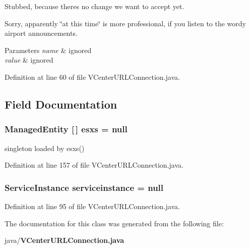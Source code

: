 Stubbed, because there\textquotesingle{}s no change we want to accept yet. 

Sorry, apparently \char`\"{}at this time\char`\"{} is more professional, if you listen to the wordy airport announcements.


\begin{DoxyParams}{Parameters}
{\em name} & ignored \\
\hline
{\em value} & ignored \\
\hline
\end{DoxyParams}


Definition at line 60 of file V\+Center\+U\+R\+L\+Connection.\+java.



\subsection{Field Documentation}
\subsubsection[{esxs}]{\setlength{\rightskip}{0pt plus 5cm}Managed\+Entity [$\,$] esxs = null\hspace{0.3cm}{\ttfamily [protected]}}\label{classorg_1_1smallfoot_1_1parser_1_1vmware_1_1VCenterURLConnection_a33f211087f486d6a140a235e1218c93c}


singleton loaded by esxs() 



Definition at line 157 of file V\+Center\+U\+R\+L\+Connection.\+java.

\subsubsection[{serviceinstance}]{\setlength{\rightskip}{0pt plus 5cm}Service\+Instance serviceinstance = null\hspace{0.3cm}{\ttfamily [protected]}}\label{classorg_1_1smallfoot_1_1parser_1_1vmware_1_1VCenterURLConnection_a0766f2c999f41d3990f184648d52ff57}


Definition at line 95 of file V\+Center\+U\+R\+L\+Connection.\+java.



The documentation for this class was generated from the following file\+:\begin{DoxyCompactItemize}
\item 
java/{\bf V\+Center\+U\+R\+L\+Connection.\+java}\end{DoxyCompactItemize}
